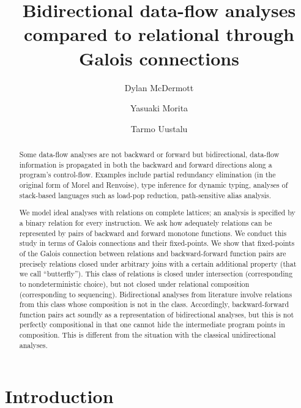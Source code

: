 \documentclass{easychair}
\title{Bidirectional data-flow analyses compared to relational through Galois connections}
\author{
  Dylan McDermott \inst{1}
\and
  Yasuaki Morita  \inst{1}
\and
  Tarmo Uustalu   \inst{1}
}
\institute{
  Reykjavik University,
  Reykjav{\'i}k, Iceland\\
  \email{dylanm@ru.is}, \email{yasuaki20@ru.is}, \email{tarmo@ru.is}
}
\theoremstyle{definition}
\begin{document}
\maketitle

\begin{abstract}
Some data-flow analyses are not backward or forward but bidirectional, data-flow information is propagated in both the backward and forward directions along a program's control-flow. Examples include partial redundancy elimination (in the original form of Morel and Renvoise), type inference for dynamic typing, analyses of stack-based languages such as load-pop reduction, path-sensitive alias analysis.

We model ideal analyses with relations on complete lattices; an analysis is specified by a binary relation for every instruction. We ask how adequately relations can be represented by pairs of backward and forward monotone functions. We conduct this study in terms of Galois connections and their fixed-points. We show that fixed-points of the Galois connection between relations and backward-forward function pairs are precisely relations closed under arbitrary joins with a certain additional property (that we call ``butterfly''). This class of relations is closed under intersection (corresponding to nondeterministic choice), but not closed under relational composition (corresponding to sequencing). Bidirectional analyses from literature involve relations from this class whose composition is not in the class. Accordingly, backward-forward function pairs act soundly as a representation of bidirectional analyses, but this is not perfectly compositional in that one cannot hide the intermediate program points in composition. This is different from the situation with the classical unidirectional analyses.
  
\end{abstract}

\section{Introduction}
\end{document}
